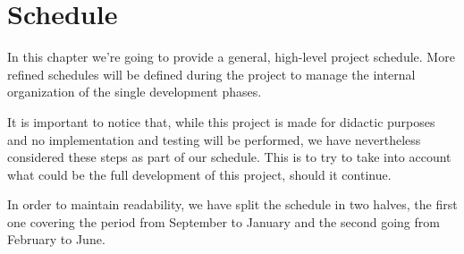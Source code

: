 \chapter{Schedule}
In this chapter we're going to provide a general, high-level project schedule. More refined schedules will be defined during the project to manage the internal organization of the single development phases.

It is important to notice that, while this project is made for didactic purposes and no implementation and testing will be performed, we have nevertheless considered these steps as part of our schedule. This is to try to take into account what could be the full development of this project, should it continue. 

In order to maintain readability, we have split the schedule in two halves, the first one covering the period from September to January and the second going from February to June.

